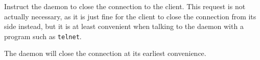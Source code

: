
\begin{reqdesc}
Instruct the daemon to close the connection to the client. This
request is not actually necessary, as it is just fine for the client
to close the connection from its side instead, but it is at least
convenient when talking to the daemon with a program such as
\texttt{telnet}.
\end{reqdesc}

\noperm

\begin{responses}
  The daemon will close the connection at its earliest convenience.
\end{responses}
